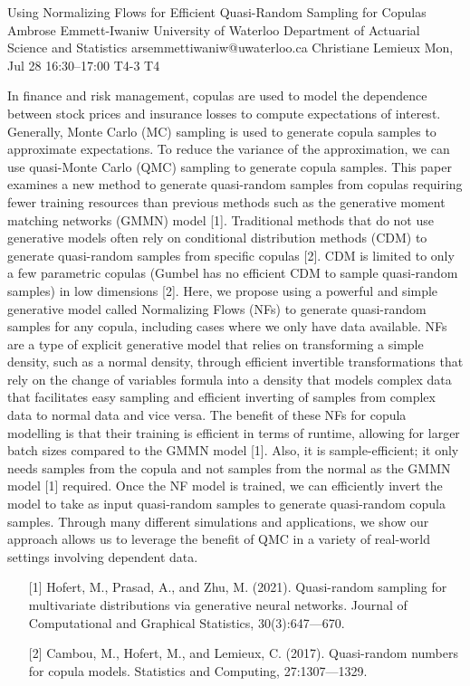 \begin{talk}
  {Using Normalizing Flows for Efficient Quasi-Random Sampling for Copulas}%
  {Ambrose Emmett-Iwaniw}%
  {University of Waterloo Department of Actuarial Science and Statistics}%
  {arsemmettiwaniw@uwaterloo.ca}%
  {Christiane Lemieux}%
  {}%
  {Mon, Jul 28 16:30–17:00}%
  {T4-3}%
  {T4}%
  
				
			
In finance and risk management, copulas are used to model the dependence between stock prices and insurance losses to compute expectations of interest. Generally, Monte Carlo (MC) sampling is used to generate copula samples to approximate expectations. To reduce the variance of the approximation, we can use quasi-Monte Carlo (QMC) sampling to generate copula samples. This paper examines a new method to generate quasi-random samples from copulas requiring fewer training resources than previous methods such as the generative moment matching networks (GMMN) model [1]. Traditional methods that do not use generative models often rely on conditional distribution methods (CDM) to generate quasi-random samples from specific copulas [2]. CDM is limited to only a few parametric copulas (Gumbel has no efficient CDM to sample quasi-random samples) in low dimensions [2]. Here, we propose using a powerful and simple generative model called Normalizing Flows (NFs) to generate quasi-random samples for any copula, including cases where we only have data available. NFs are a type of explicit generative model that relies on transforming a simple density, such as a normal density, through efficient invertible transformations that rely on the change of variables formula into a density that models complex data that facilitates easy sampling and efficient inverting of samples from complex data to normal data and vice versa. The benefit of these NFs for copula modelling is that their training is efficient in terms of runtime, allowing for larger batch sizes compared to the GMMN model [1]. Also, it is sample-efficient; it only needs samples from the copula and not samples from the normal as the GMMN model [1] required. Once the NF model is trained, we can efficiently invert the model to take as input quasi-random samples to generate quasi-random copula samples. Through many different simulations and applications, we show our approach allows us to leverage the benefit of QMC in a variety of real-world settings involving dependent data.
\medskip

\begin{enumerate}
	\item[{[1]}] Hofert, M., Prasad, A., and Zhu, M. (2021). Quasi-random sampling for multivariate distributions via generative neural networks. Journal of Computational and Graphical Statistics,
30(3):647---670.
	\item[{[2]}] Cambou, M., Hofert, M., and Lemieux, C. (2017). Quasi-random numbers for copula models. Statistics and Computing, 27:1307---1329. 
\end{enumerate}
\end{talk}

